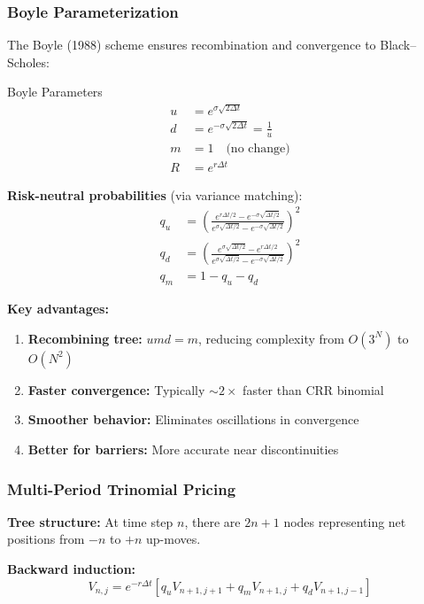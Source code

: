 \documentclass[10pt,twocolumn]{article}
\begin{document}
\subsubsection{Boyle Parameterization}

The Boyle (1988) scheme ensures recombination and convergence to Black--Scholes:

\begin{keybox}{Boyle Parameters}
\begin{align}
u &= e^{\sigma\sqrt{2\Delta t}}\\
d &= e^{-\sigma\sqrt{2\Delta t}} = \frac{1}{u}\\
m &= 1 \quad \text{(no change)}\\
R &= e^{r\Delta t}
\end{align}

\textbf{Risk-neutral probabilities} (via variance matching):
\begin{align}
q_u &= \left(\frac{e^{r\Delta t/2} - e^{-\sigma\sqrt{\Delta t/2}}}{e^{\sigma\sqrt{\Delta t/2}} - e^{-\sigma\sqrt{\Delta t/2}}}\right)^2\\
q_d &= \left(\frac{e^{\sigma\sqrt{\Delta t/2}} - e^{r\Delta t/2}}{e^{\sigma\sqrt{\Delta t/2}} - e^{-\sigma\sqrt{\Delta t/2}}}\right)^2\\
q_m &= 1 - q_u - q_d
\end{align}
\end{keybox}

\textbf{Key advantages:}
\begin{enumerate}[itemsep=2pt]
    \item \textbf{Recombining tree:} $umd = m$, reducing complexity from $O(3^N)$ to $O(N^2)$
    \item \textbf{Faster convergence:} Typically $\sim 2\times$ faster than CRR binomial
    \item \textbf{Smoother behavior:} Eliminates oscillations in convergence
    \item \textbf{Better for barriers:} More accurate near discontinuities
\end{enumerate}

\subsubsection{Multi-Period Trinomial Pricing}

\textbf{Tree structure:} At time step $n$, there are $2n + 1$ nodes representing net positions from $-n$ to $+n$ up-moves.

\textbf{Backward induction:}
\begin{equation}
V_{n,j} = e^{-r\Delta t}[q_u V_{n+1,j+1} + q_m V_{n+1,j} + q_d V_{n+1,j-1}]
\end{equation}
\end{document}
